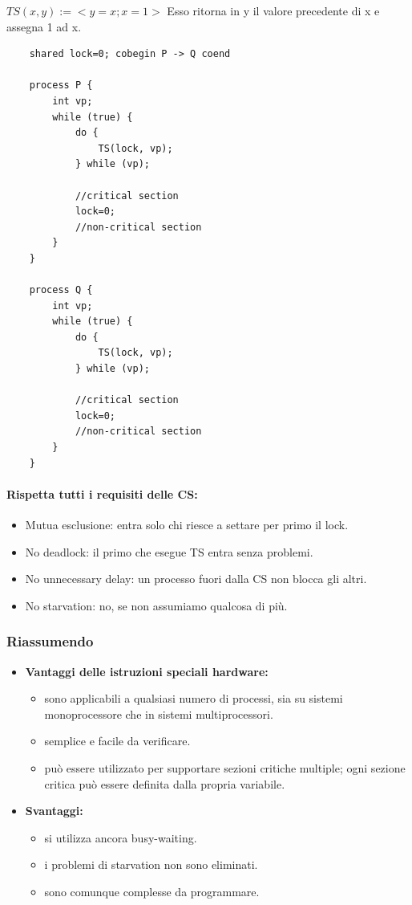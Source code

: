 $TS(x,y) := < y = x ; x = 1 >$
\newline
Esso ritorna in y il valore precedente di x e assegna 1 ad x.

\begin{lstlisting}
    shared lock=0; cobegin P -> Q coend
    
    process P {
        int vp;
        while (true) {
            do {
                TS(lock, vp);
            } while (vp);
            
            //critical section
            lock=0;
            //non-critical section
        }
    }

    process Q {
        int vp;
        while (true) {
            do {
                TS(lock, vp);
            } while (vp);
            
            //critical section
            lock=0;
            //non-critical section
        }
    }
\end{lstlisting}

\paragraph{Rispetta tutti i requisiti delle CS:}
\begin{itemize}
    \item Mutua esclusione: entra solo chi riesce a settare per primo il lock.
    \item No deadlock: il primo che esegue TS entra senza problemi.
    \item No unnecessary delay: un processo fuori dalla CS non blocca gli altri.
    \item No starvation: no, se non assumiamo qualcosa di più.
\end{itemize}

\subsubsection{Riassumendo}
\begin{itemize}
    \item \textbf{Vantaggi delle istruzioni speciali hardware:}
    \begin{itemize}
        \item sono applicabili a qualsiasi numero di processi, sia su sistemi monoprocessore che in sistemi multiprocessori.
        \item semplice e facile da verificare.
        \item può essere utilizzato per supportare sezioni critiche multiple; ogni sezione critica può essere definita dalla propria variabile.
    \end{itemize}
    \item \textbf{Svantaggi:}
    \begin{itemize}
        \item si utilizza ancora busy-waiting.
        \item i problemi di starvation non sono eliminati.
        \item sono comunque complesse da programmare.
    \end{itemize}
\end{itemize}
\newpage
